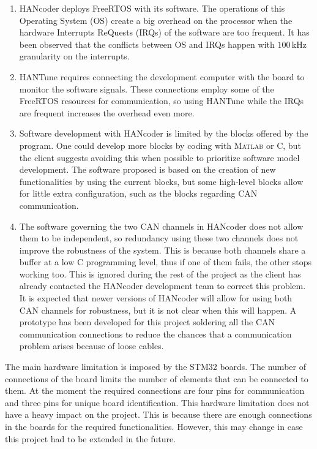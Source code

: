 \documentclass[table,xcdraw]{article}
\begin{document}
\begin{enumerate}
    \item HANcoder deploys FreeRTOS with its software. The operations of this Operating System (OS) create a big overhead on the processor when the hardware Interrupts ReQuests (IRQs) of the software are too frequent. It has been observed that the conflicts between OS and IRQs happen with $100\,$kHz granularity on the interrupts.
    \item HANTune requires connecting the development computer with the board to monitor the software signals. These connections employ some of the FreeRTOS resources for communication, so using HANTune while the IRQs are frequent increases the overhead even more.
    \item Software development with HANcoder is limited by the blocks offered by the program. One could develop more blocks by coding with \textsc{Matlab} or C, but the client suggests avoiding this when possible to prioritize software model development. The software proposed is based on the creation of new functionalities by using the current blocks, but some high-level blocks allow for little extra configuration, such as the blocks regarding CAN communication.
    \item The software governing the two CAN channels in HANcoder does not allow them to be independent, so redundancy using these two channels does not improve the robustness of the system. This is because both channels share a buffer at a low C programming level, thus if one of them fails, the other stops working too. This is ignored during the rest of the project as the client has already contacted the HANcoder development team to correct this problem. It is expected that newer versions of HANcoder will allow for using both CAN channels for robustness, but it is not clear when this will happen. A prototype has been developed for this project soldering all the CAN communication connections to reduce the chances that a communication problem arises because of loose cables.
\end{enumerate}

The main hardware limitation is imposed by the STM32 boards. The number of connections of the board limits the number of elements that can be connected to them. At the moment the required connections are four pins for communication and three pins for unique board identification. This hardware limitation does not have a heavy impact on the project. This is because there are enough connections in the boards for the required functionalities. However, this may change in case this project had to be extended in the future.\\
\end{document}
